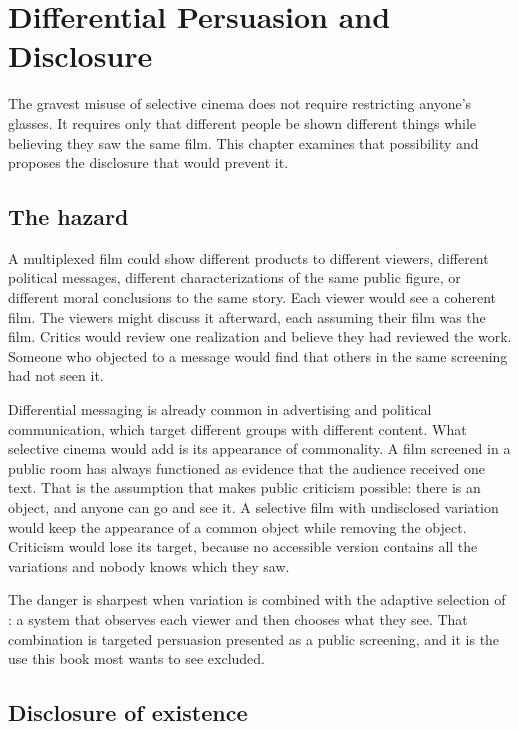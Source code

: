\chapter{Differential Persuasion and Disclosure}\label{ch:persuasion}

The gravest misuse of selective cinema does not require restricting anyone's glasses. It requires only that different people be shown different things while believing they saw the same film. This chapter examines that possibility and proposes the disclosure that would prevent it.

\section{The hazard}

A multiplexed film could show different products to different viewers, different political messages, different characterizations of the same public figure, or different moral conclusions to the same story. Each viewer would see a coherent film. The viewers might discuss it afterward, each assuming their film was the film. Critics would review one realization and believe they had reviewed the work. Someone who objected to a message would find that others in the same screening had not seen it.

Differential messaging is already common in advertising and political communication, which target different groups with different content. What selective cinema would add is its appearance of commonality. A film screened in a public room has always functioned as evidence that the audience received one text. That is the assumption that makes public criticism possible: there is an object, and anyone can go and see it. A selective film with undisclosed variation would keep the appearance of a common object while removing the object. Criticism would lose its target, because no accessible version contains all the variations and nobody knows which they saw.

The danger is sharpest when variation is combined with the adaptive selection of : a system that observes each viewer and then chooses what they see. That combination is targeted persuasion presented as a public screening, and it is the use this book most wants to see excluded.

\section{Disclosure of existence}

